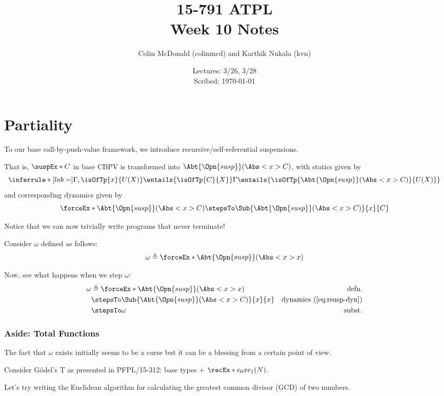 \documentclass[letterpaper]{article}
\title{15-791 ATPL \\ Week 10 Notes}
\author{Colin McDonald (colinmcd) and Karthik Nukala (kvn)}
\date{Lectures: 3/26, 3/28 \\ Scribed: \today}
\newcommand{\rSuspEx}[2]{\Abt{\Opn{susp}}(\Abs<#1>{#2})}
\begin{document}
\maketitle
\section{Partiality}

To our base call-by-push-value framework, we introduce recursive/self-referential
suspensions.

That is, $\suspEx*{C}$ in base CBPV is transformed into $\rSuspEx{x}{C}$, with statics given by
\begin{equation}\label{eq:rsusp-stc}
    \defrule
    { \Gamma, \isOfTp{x}{U(X)}\entails{\isOfTp{C}{X}} }
    { \Gamma \entails{\isOfTp{\rSuspEx{x}{C}}{U(X)}} }
  \end{equation}
and corresponding dynamics given by
\begin{equation}\label{eq:rsusp-dyn}
    \forceEx*{\rSuspEx{x}{C}}\stepsTo \Sub{\rSuspEx{x}{C}}{x}{C}
\end{equation}

Notice that we can now trivially write programs that never terminate!

Consider $\omega$ defined as follows:
\[
    \omega \triangleq \forceEx*{\rSuspEx{x}{x}}
\]

Now, see what happens when we step $\omega$:
\begin{align*}
    \omega &\triangleq \forceEx*{\rSuspEx{x}{x}} &\text{defn.} \\
    &\stepsTo \Sub{\rSuspEx{x}{C}}{x}{x} &\text{dynamics (\ref{eq:rsusp-dyn})}\\
    &\stepsTo \omega &\text{subst.}
\end{align*}

\subsubsection{Aside: Total Functions}
The fact that $\omega$ exists initially seems to be a curse but it can be a blessing from a certain point of view.

Consider G\"{o}del's T as presented in PFPL/15-312: base types + $\recEx*{e_0}{x}{e_1}({N})$.

Let's try writing the Euclidean algorithm for calculating the greatest
common divisor (GCD) of two numbers.
\end{document}
